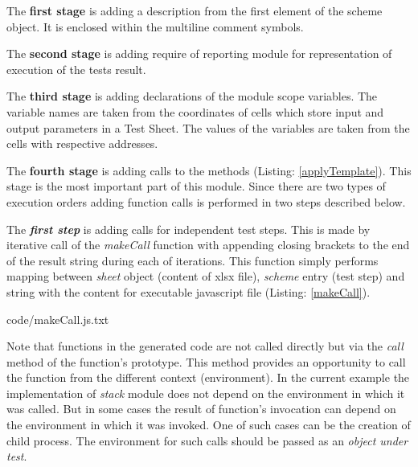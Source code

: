The \textbf{first stage} is adding a description from the first element of the scheme object. It is enclosed within the multiline comment symbols.


The \textbf{second stage} is adding require of reporting module for representation of execution of the tests result.


The \textbf{third stage} is adding declarations of the module scope variables. The variable names are taken from the coordinates of cells which store input and output parameters in a Test Sheet. The values of the variables are taken from the cells with respective addresses.


The \textbf{fourth stage} is adding calls to the methods (Listing: \ref{applyTemplate}). This stage is the most important part of this module. Since there are two types of execution orders adding function calls is performed in two steps described below. 


The \textit{\textbf{first step}} is adding calls for independent test steps. This is made by iterative call of the \textit{makeCall} function with appending closing brackets to the end of the result string during each of iterations. This function simply performs mapping between \textit{sheet} object (content of xlsx file), \textit{scheme} entry (test step) and string with the content for executable javascript file (Listing: \ref{makeCall}).


{code/makeCall.js.txt}

Note that functions in the generated code are not called directly but via the \textit{call} method of the function's prototype. This method provides an opportunity to call the function from the different context (environment). In the current example the implementation of \textit{stack} module does not depend on the environment in which it was called. But in some cases the result of function's invocation can depend on the environment in which it was invoked. One of such cases can be the creation of child process. The environment for such calls should be passed as an \textit{object under test}.


